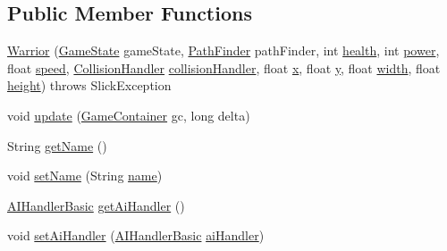 \subsection*{Public Member Functions}
\begin{DoxyCompactItemize}
\item 
\mbox{\hyperlink{classentities_1_1_warrior_ac208eac0cd98402f9defd7f808924b05}{Warrior}} (\mbox{\hyperlink{classstates_1_1_game_state}{Game\+State}} game\+State, \mbox{\hyperlink{classentities_1_1_path_finder}{Path\+Finder}} path\+Finder, int \mbox{\hyperlink{classentities_1_1_subject_a8285660fdae3f0b220bbc686cf5c012c}{health}}, int \mbox{\hyperlink{classentities_1_1_subject_a7bd41d6fe9656de66d4a08c4a9565ec4}{power}}, float \mbox{\hyperlink{classentities_1_1_mobile_entity_a815a9d2b23a0bb7e3ee7739d4c10d7c3}{speed}}, \mbox{\hyperlink{classentities_1_1_collision_handler}{Collision\+Handler}} \mbox{\hyperlink{classentities_1_1_mobile_entity_a29fbe797671b1fc81eafe1e48fdc46f9}{collision\+Handler}}, float \mbox{\hyperlink{classorg_1_1newdawn_1_1slick_1_1geom_1_1_shape_a3e985bfff386c15a4efaad03d8ad60d3}{x}}, float \mbox{\hyperlink{classorg_1_1newdawn_1_1slick_1_1geom_1_1_shape_a9f934baded6a1b65ebb69e7e5f80ea00}{y}}, float \mbox{\hyperlink{classorg_1_1newdawn_1_1slick_1_1geom_1_1_rectangle_a967e1823f62daf45abb142779d1be62d}{width}}, float \mbox{\hyperlink{classorg_1_1newdawn_1_1slick_1_1geom_1_1_rectangle_a3bd010fdce636fc11ed0e0ad4d4b4a0a}{height}})  throws Slick\+Exception 
\item 
void \mbox{\hyperlink{classentities_1_1_warrior_a2c05623f54a94a3cf0bc7c07f6963a49}{update}} (\mbox{\hyperlink{classorg_1_1newdawn_1_1slick_1_1_game_container}{Game\+Container}} gc, long delta)
\item 
String \mbox{\hyperlink{classentities_1_1_warrior_ab2cfa037b8077913f266df893d83e60b}{get\+Name}} ()
\item 
void \mbox{\hyperlink{classentities_1_1_warrior_a54b1c7f1fe10f56a7d79bdb2ca5bac47}{set\+Name}} (String \mbox{\hyperlink{classentities_1_1_warrior_a1fab32d35334023bc7cd4866841e817b}{name}})
\item 
\mbox{\hyperlink{classentities_1_1_a_i_handler_basic}{A\+I\+Handler\+Basic}} \mbox{\hyperlink{classentities_1_1_warrior_a20baa7b8b0b22cb20f4dc996e6a0b43e}{get\+Ai\+Handler}} ()
\item 
void \mbox{\hyperlink{classentities_1_1_warrior_a5b1865118c28ac6acc320021e6d89917}{set\+Ai\+Handler}} (\mbox{\hyperlink{classentities_1_1_a_i_handler_basic}{A\+I\+Handler\+Basic}} \mbox{\hyperlink{classentities_1_1_warrior_a5192a845694a855efc603e4e89d6df38}{ai\+Handler}})
\end{DoxyCompactItemize}
